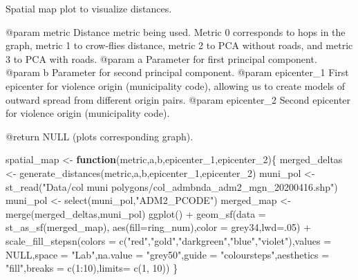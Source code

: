 \documentclass[
]{article}
\newenvironment{Shaded}{\begin{snugshade}}{\end{snugshade}}
\newcommand{\AttributeTok}[1]{\textcolor[rgb]{0.77,0.63,0.00}{#1}}
\newcommand{\ConstantTok}[1]{\textcolor[rgb]{0.00,0.00,0.00}{#1}}
\newcommand{\ControlFlowTok}[1]{\textcolor[rgb]{0.13,0.29,0.53}{\textbf{#1}}}
\newcommand{\DecValTok}[1]{\textcolor[rgb]{0.00,0.00,0.81}{#1}}
\newcommand{\FunctionTok}[1]{\textcolor[rgb]{0.00,0.00,0.00}{#1}}
\newcommand{\NormalTok}[1]{#1}
\newcommand{\OtherTok}[1]{\textcolor[rgb]{0.56,0.35,0.01}{#1}}
\newcommand{\SpecialCharTok}[1]{\textcolor[rgb]{0.00,0.00,0.00}{#1}}
\newcommand{\StringTok}[1]{\textcolor[rgb]{0.31,0.60,0.02}{#1}}
\begin{document}
Spatial map plot to visualize distances.

@param metric Distance metric being used. Metric 0 corresponds to hops
in the graph, metric 1 to crow-flies distance, metric 2 to PCA without
roads, and metric 3 to PCA with roads. @param a Parameter for first
principal component. @param b Parameter for second principal component.
@param epicenter\_1 First epicenter for violence origin (municipality
code), allowing us to create models of outward spread from different
origin pairs. @param epicenter\_2 Second epicenter for violence origin
(municipality code).

@return NULL (plots corresponding graph).

\begin{Shaded}
\begin{Highlighting}[]
\NormalTok{spatial\_map }\OtherTok{\textless{}{-}} \ControlFlowTok{function}\NormalTok{(metric,a,b,epicenter\_1,epicenter\_2)\{}
\NormalTok{merged\_deltas }\OtherTok{\textless{}{-}} \FunctionTok{generate\_distances}\NormalTok{(metric,a,b,epicenter\_1,epicenter\_2)}
\NormalTok{muni\_pol }\OtherTok{\textless{}{-}} \FunctionTok{st\_read}\NormalTok{(}\StringTok{"Data/col muni polygons/col\_admbnda\_adm2\_mgn\_20200416.shp"}\NormalTok{)}
\NormalTok{muni\_pol }\OtherTok{\textless{}{-}} \FunctionTok{select}\NormalTok{(muni\_pol,}\StringTok{"ADM2\_PCODE"}\NormalTok{)}
\NormalTok{merged\_map }\OtherTok{\textless{}{-}} \FunctionTok{merge}\NormalTok{(merged\_deltas,muni\_pol)}
\FunctionTok{ggplot}\NormalTok{() }\SpecialCharTok{+}
  \FunctionTok{geom\_sf}\NormalTok{(}\AttributeTok{data =} \FunctionTok{st\_as\_sf}\NormalTok{(merged\_map), }\FunctionTok{aes}\NormalTok{(}\AttributeTok{fill=}\NormalTok{ring\_num),}\AttributeTok{color =} \StringTok{\textquotesingle{}grey34\textquotesingle{}}\NormalTok{,}\AttributeTok{lwd=}\NormalTok{.}\DecValTok{05}\NormalTok{) }\SpecialCharTok{+}
  \FunctionTok{scale\_fill\_stepsn}\NormalTok{(}\AttributeTok{colors =} \FunctionTok{c}\NormalTok{(}\StringTok{"red"}\NormalTok{,}\StringTok{"gold"}\NormalTok{,}\StringTok{"darkgreen"}\NormalTok{,}\StringTok{"blue"}\NormalTok{,}\StringTok{"violet"}\NormalTok{),}\AttributeTok{values =} \ConstantTok{NULL}\NormalTok{,}\AttributeTok{space =} \StringTok{"Lab"}\NormalTok{,}\AttributeTok{na.value =} \StringTok{"grey50"}\NormalTok{,}\AttributeTok{guide =} \StringTok{"coloursteps"}\NormalTok{,}\AttributeTok{aesthetics =} \StringTok{"fill"}\NormalTok{,}\AttributeTok{breaks =} \FunctionTok{c}\NormalTok{(}\DecValTok{1}\SpecialCharTok{:}\DecValTok{10}\NormalTok{),}\AttributeTok{limits=} \FunctionTok{c}\NormalTok{(}\DecValTok{1}\NormalTok{, }\DecValTok{10}\NormalTok{))}
\NormalTok{\}}
\end{Highlighting}
\end{Shaded}
\end{document}
